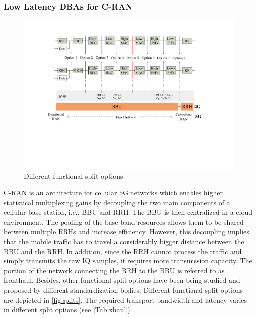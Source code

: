 \subsubsection{Low Latency \acp{DBA} for \ac{C-RAN}}
\begin{figure}[t]
      \centering
      \includegraphics[width=\columnwidth]{Figures/splits.pdf}
      \caption{Different functional split options \cite{ituG.front}}
      \label{fig:splits}
 \end{figure}
\ac{C-RAN} is an architecture for cellular 5G networks which enables higher statistical multiplexing gains by decoupling the two main components of a cellular base station, i.e., \ac{BBU} and \ac{RRH}. The \ac{BBU} is then centralized in a cloud environment. The pooling of the base band resources allows them to be shared between multiple \acp{RRH} and increase efficiency. However, this decoupling implies that the mobile traffic has to travel a considerably bigger distance between the \ac{BBU} and the \ac{RRH}. In addition, since the \ac{RRH} cannot process the traffic and simply transmits the raw \ac{IQ} samples, it requires more transmission capacity. The portion of the network connecting the \ac{RRH} to the \ac{BBU} is referred to as fronthaul. Besides, other functional split options have been being studied \cite{7456186} and proposed by different standardization bodies.
Different functional split options are depicted in \autoref{fig:splits}.
The required transport bandwidth and latency varies in different split options (see \autoref{Tab:xhaul}).
